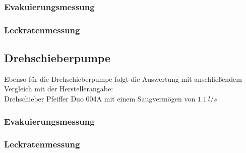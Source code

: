 \subsubsection{Evakuierungsmessung}

\subsubsection{Leckratenmessung}
\subsection{Drehschieberpumpe}
Ebenso für die Drehschieberpumpe folgt die Auswertung mit anschließendem Vergleich mit der
Herstellerangabe:\\
Drehschieber Pfeiffer Duo 004A mit einem Saugvermögen von $\SI{1,1}{l/s}$
\subsubsection{Evakuierungsmessung}
\subsubsection{Leckratenmessung}
